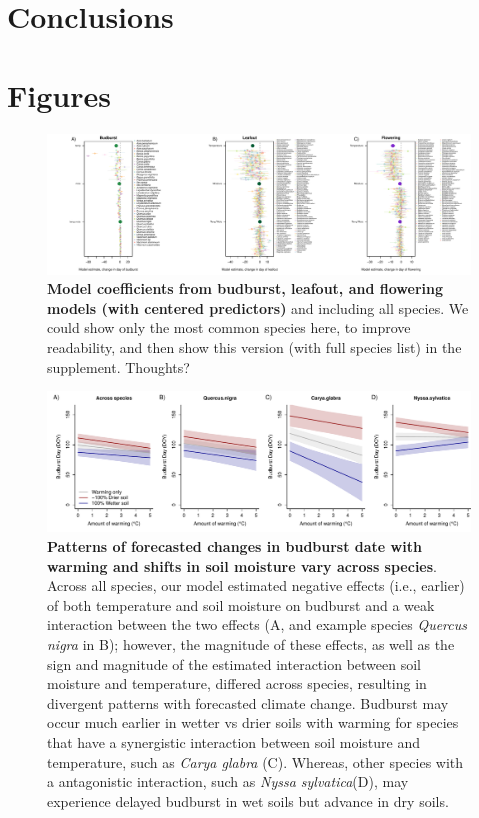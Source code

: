 \documentclass{article}
\begin{document}
\section* {Conclusions}




\section*{Figures}


\begin{figure}[h]
\centering
 \includegraphics{../../Analyses/soilmoisture/figures/m5_bbdlofl.pdf}
 \caption{\textbf{Model coefficients from budburst, leafout, and flowering models (with centered predictors)} and including all species. We could show only the most common species here, to improve readability, and then show this version (with full species list) in the supplement. Thoughts?} 
 \label{fig:bblofl}
 \end{figure}
 

 \begin{figure}[h]
\centering
 \includegraphics{../../Analyses/soilmoisture/figures/tempforecast_bb_0_5_135_28_105_4_degwarm.pdf}
 
 \caption{\textbf{Patterns of forecasted changes in budburst date with warming and shifts in soil moisture vary across species}. Across all species, our model estimated negative effects (i.e., earlier) of both temperature and soil moisture on budburst and a weak interaction between the two effects (A, and example species \textit{Quercus nigra} in B); however, the magnitude of these effects, as well as the sign and magnitude of the estimated interaction between soil moisture and temperature, differed across species, resulting in divergent patterns with forecasted climate change. Budburst may occur much earlier in wetter vs drier soils with warming for species that have a synergistic interaction between soil moisture and temperature, such as \textit{Carya glabra} (C). Whereas, other species with a antagonistic interaction, such as \textit{Nyssa sylvatica}(D), may experience delayed budburst in wet soils but advance in dry soils.}
 \label{fig:bbsp}
 \end{figure}

\end{document}

